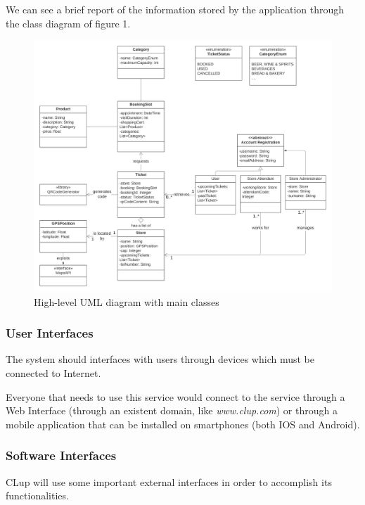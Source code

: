 \documentclass[table, 12pt]{article}
\begin{document}
We can see a brief report of the information stored by the application through the class diagram of figure 1.

\begin{figure}
    \begin{center}
        \hspace*{-1.5in}
        \includegraphics[width=\paperwidth]{assets/UML.png}
        \caption{High-level UML diagram with main classes}
    \end{center}

\end{figure}

\subsubsection{User Interfaces}
The system should interfaces with users through devices which must be connected to Internet.

Everyone that needs to use this service would connect to the service through a Web Interface (through an existent domain, like \textit{www.clup.com}) or through a mobile application that can be installed on smartphones (both IOS and Android).

\subsubsection{Software Interfaces}
CLup will use some important external interfaces in order to accomplish its functionalities.
\end{document}
